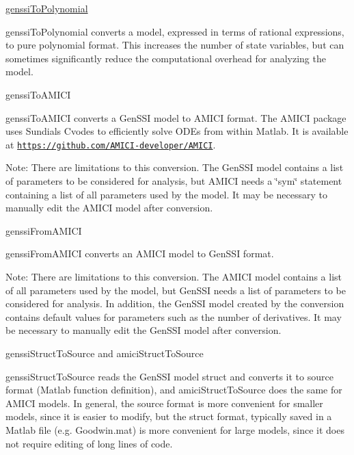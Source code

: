 \begin{DoxyCode}
\hyperlink{genssi_to_polynomial_8m_acef0ff085917e1375d0fc2b6feed0722}{genssiToPolynomial} 
\end{DoxyCode}


genssi\+To\+Polynomial converts a model, expressed in terms of rational expressions, to pure polynomial format. This increases the number of state variables, but can sometimes significantly reduce the computational overhead for analyzing the model.


\begin{DoxyCode}
genssiToAMICI 
\end{DoxyCode}


genssi\+To\+A\+M\+I\+CI converts a Gen\+S\+SI model to A\+M\+I\+CI format. The A\+M\+I\+CI package uses Sundials Cvodes to efficiently solve O\+D\+Es from within Matlab. It is available at \href{https://github.com/AMICI-developer/AMICI}{\tt https\+://github.\+com/\+A\+M\+I\+C\+I-\/developer/\+A\+M\+I\+CI}.

Note\+: There are limitations to this conversion. The Gen\+S\+SI model contains a list of parameters to be considered for analysis, but A\+M\+I\+CI needs a \char`\"{}sym\char`\"{} statement containing a list of all parameters used by the model. It may be necessary to manually edit the A\+M\+I\+CI model after conversion.


\begin{DoxyCode}
genssiFromAMICI 
\end{DoxyCode}


genssi\+From\+A\+M\+I\+CI converts an A\+M\+I\+CI model to Gen\+S\+SI format.

Note\+: There are limitations to this conversion. The A\+M\+I\+CI model contains a list of all parameters used by the model, but Gen\+S\+SI needs a list of parameters to be considered for analysis. In addition, the Gen\+S\+SI model created by the conversion contains default values for parameters such as the number of derivatives. It may be necessary to manually edit the Gen\+S\+SI model after conversion.


\begin{DoxyCode}
genssiStructToSource and amiciStructToSource 
\end{DoxyCode}


genssi\+Struct\+To\+Source reads the Gen\+S\+SI model struct and converts it to source format (Matlab function definition), and amici\+Struct\+To\+Source does the same for A\+M\+I\+CI models. In general, the source format is more convenient for smaller models, since it is easier to modify, but the struct format, typically saved in a Matlab file (e.\+g. Goodwin.\+mat) is more convenient for large models, since it does not require editing of long lines of code. 